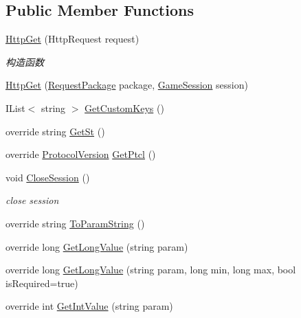 \subsection*{Public Member Functions}
\begin{DoxyCompactItemize}
\item 
\mbox{\hyperlink{class_t_net_1_1_contract_1_1_http_get_ab2b281b01c8c18b90d38a6d7b190a400}{Http\+Get}} (Http\+Request request)
\begin{DoxyCompactList}\small\item\em 构造函数 \end{DoxyCompactList}\item 
\mbox{\hyperlink{class_t_net_1_1_contract_1_1_http_get_a07b82879b0d4a56ba56fc861df59b304}{Http\+Get}} (\mbox{\hyperlink{class_t_net_1_1_contract_1_1_request_package}{Request\+Package}} package, \mbox{\hyperlink{class_t_net_1_1_contract_1_1_game_session}{Game\+Session}} session)
\item 
I\+List$<$ string $>$ \mbox{\hyperlink{class_t_net_1_1_contract_1_1_http_get_ad6a9b12bfe6b14220122a4aef9abf27b}{Get\+Custom\+Keys}} ()
\item 
override string \mbox{\hyperlink{class_t_net_1_1_contract_1_1_http_get_ac2e53bdcb1a579f28ac4002ab15e6bb3}{Get\+St}} ()
\item 
override \mbox{\hyperlink{namespace_t_net_1_1_service_a6651119df6dac62b849ed58cf7ece2bd}{Protocol\+Version}} \mbox{\hyperlink{class_t_net_1_1_contract_1_1_http_get_a7af9627d277a09b1a43cf88e62e86ba3}{Get\+Ptcl}} ()
\item 
void \mbox{\hyperlink{class_t_net_1_1_contract_1_1_http_get_af1818c08d64b78866ea0f056c43cf5b5}{Close\+Session}} ()
\begin{DoxyCompactList}\small\item\em close session \end{DoxyCompactList}\item 
override string \mbox{\hyperlink{class_t_net_1_1_contract_1_1_http_get_ae56808541aaa8e27cabf0813ee0dc424}{To\+Param\+String}} ()
\item 
override long \mbox{\hyperlink{class_t_net_1_1_contract_1_1_http_get_abc50337872a82cb2ae04e19d3fc5032a}{Get\+Long\+Value}} (string param)
\item 
override long \mbox{\hyperlink{class_t_net_1_1_contract_1_1_http_get_a0dc96936421b99f52d03571a71c9e4e4}{Get\+Long\+Value}} (string param, long min, long max, bool is\+Required=true)
\item 
override int \mbox{\hyperlink{class_t_net_1_1_contract_1_1_http_get_a0ad6bffa55b113fc8960d8e10ed6a531}{Get\+Int\+Value}} (string param)

\end{DoxyCompactItemize}
